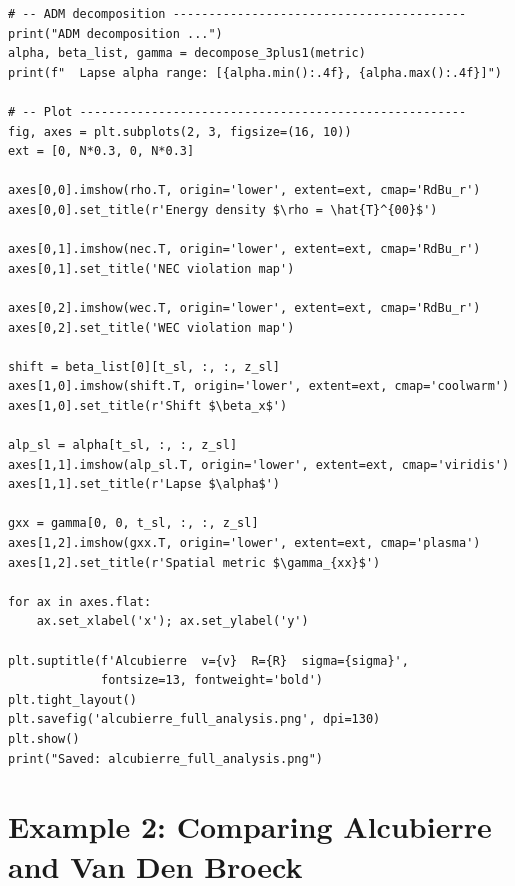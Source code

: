 \documentclass[11pt, a4paper, twoside]{report}
\begin{document}
\begin{lstlisting}[caption={Complete Alcubierre analysis script}]
# -- ADM decomposition -----------------------------------------
print("ADM decomposition ...")
alpha, beta_list, gamma = decompose_3plus1(metric)
print(f"  Lapse alpha range: [{alpha.min():.4f}, {alpha.max():.4f}]")

# -- Plot ------------------------------------------------------
fig, axes = plt.subplots(2, 3, figsize=(16, 10))
ext = [0, N*0.3, 0, N*0.3]

axes[0,0].imshow(rho.T, origin='lower', extent=ext, cmap='RdBu_r')
axes[0,0].set_title(r'Energy density $\rho = \hat{T}^{00}$')

axes[0,1].imshow(nec.T, origin='lower', extent=ext, cmap='RdBu_r')
axes[0,1].set_title('NEC violation map')

axes[0,2].imshow(wec.T, origin='lower', extent=ext, cmap='RdBu_r')
axes[0,2].set_title('WEC violation map')

shift = beta_list[0][t_sl, :, :, z_sl]
axes[1,0].imshow(shift.T, origin='lower', extent=ext, cmap='coolwarm')
axes[1,0].set_title(r'Shift $\beta_x$')

alp_sl = alpha[t_sl, :, :, z_sl]
axes[1,1].imshow(alp_sl.T, origin='lower', extent=ext, cmap='viridis')
axes[1,1].set_title(r'Lapse $\alpha$')

gxx = gamma[0, 0, t_sl, :, :, z_sl]
axes[1,2].imshow(gxx.T, origin='lower', extent=ext, cmap='plasma')
axes[1,2].set_title(r'Spatial metric $\gamma_{xx}$')

for ax in axes.flat:
    ax.set_xlabel('x'); ax.set_ylabel('y')

plt.suptitle(f'Alcubierre  v={v}  R={R}  sigma={sigma}',
             fontsize=13, fontweight='bold')
plt.tight_layout()
plt.savefig('alcubierre_full_analysis.png', dpi=130)
plt.show()
print("Saved: alcubierre_full_analysis.png")
\end{lstlisting}

\section{Example 2: Comparing Alcubierre and Van Den Broeck}
\end{document}
